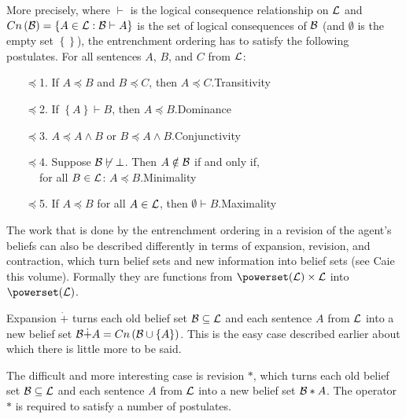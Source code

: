 More precisely, where $\vdash$ is the logical consequence relationship on $\cal L$ and $Cn\left(\cal B\right)=\left\{A\in\begin{cal}L\end{cal}:\begin{cal}B\end{cal}\vdash A\right\}$ is the set of logical consequences of $\cal B$ (and $\emptyset$ is the empty set $\left\{\right\}$), the entrenchment ordering has to satisfy the following postulates. For all sentences $A$, $B$, and $C$ from $\cal L$:
\begin{enumerate}
\item[$\preceq$1.] If $A\preceq B$ and $B\preceq C$, then $A\preceq C$.\hfill Transitivity
\item[$\preceq$2.] If $\left\{A\right\}\vdash B$, then $A\preceq B$.\hfill Dominance
\item[$\preceq$3.] $A\preceq A\wedge B$ or $B\preceq A\wedge B$.\hfill Conjunctivity
\item[$\preceq$4.] Suppose $\begin{cal}B\end{cal}\not\vdash\bot$. Then $A\notin\cal B$ if and only if,\\$\phantom{M}$\hspace{1em} for all $B\in\cal L$: $A\preceq B$.\hfill Minimality
\item[$\preceq$5.] If $A\preceq B$ for all $A\in\cal L$, then $\emptyset\vdash B$.\hfill Maximality
\end{enumerate}

The work that is done by the entrenchment ordering in a revision of the agent's beliefs can also be described differently in terms of expansion, revision, and contraction, which turn belief sets and new information into belief sets (see Caie this volume). Formally they are functions from $\powerset\!\left(\cal L\right)\times\cal L$ into $\powerset\!\left(\cal L\right)$.

Expansion $\dot+$ turns each old belief set $\cal B\subseteq L$ and each sentence $A$ from $\cal L$ into a new belief set $\begin{cal}B\end{cal}\dot+A=Cn\left(\begin{cal}B\end{cal}\cup\left\{A\right\}\right)$. This is the easy case described earlier about which there is little more to be said.

The difficult and more interesting case is revision $*$, which turns each old belief set $\cal B\subseteq L$ and each sentence $A$ from $\cal L$ into a new belief set $\begin{cal}B\end{cal}*A$. The operator $*$ is required to satisfy a number of postulates.

